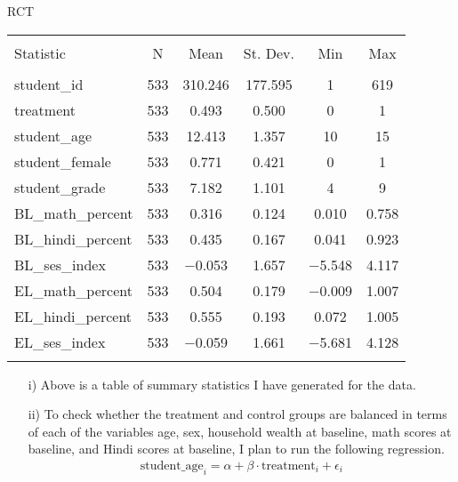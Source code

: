 \begin{homeworkProblem}{RCT}
\begin{enumerate}
    \end{enumerate}

    \begin{solution}
        
        \begin{table}[!htbp] \centering 
            \begin{tabular}{@{\extracolsep{5pt}}lccccc} 
                \\[-1.8ex]\hline 
                \hline \\[-1.8ex] 
                Statistic & \multicolumn{1}{c}{N} & \multicolumn{1}{c}{Mean} & \multicolumn{1}{c}{St. Dev.} & \multicolumn{1}{c}{Min} & \multicolumn{1}{c}{Max} \\ 
                \hline \\[-1.8ex] 
                student\_id & 533 & 310.246 & 177.595 & 1 & 619 \\ 
                treatment & 533 & 0.493 & 0.500 & 0 & 1 \\ 
                student\_age & 533 & 12.413 & 1.357 & 10 & 15 \\ 
                student\_female & 533 & 0.771 & 0.421 & 0 & 1 \\ 
                student\_grade & 533 & 7.182 & 1.101 & 4 & 9 \\ 
                BL\_math\_percent & 533 & 0.316 & 0.124 & 0.010 & 0.758 \\ 
                BL\_hindi\_percent & 533 & 0.435 & 0.167 & 0.041 & 0.923 \\ 
                BL\_ses\_index & 533 & $-$0.053 & 1.657 & $-$5.548 & 4.117 \\ 
                EL\_math\_percent & 533 & 0.504 & 0.179 & $-$0.009 & 1.007 \\ 
                EL\_hindi\_percent & 533 & 0.555 & 0.193 & 0.072 & 1.005 \\ 
                EL\_ses\_index & 533 & $-$0.059 & 1.661 & $-$5.681 & 4.128 \\ 
                \hline \\[-1.8ex] 
            \end{tabular} 
        \end{table} 

        \begin{enumerate}
            \item[i)] Above is a table of summary statistics I have generated
                for the data. 
            \item[ii)] To check whether the treatment and control groups are
                balanced in terms of each of the variables age, sex, household
                wealth at baseline, math scores at baseline, and Hindi scores
                at baseline, I plan to run the following regression. 
                \[
                    \begin{split}
                        \text{student\_age}_i = \alpha + \beta \cdot \text{treatment}_i + \epsilon_i
                    \end{split}
                \]


\end{enumerate}
\end{solution}
\end{homeworkProblem}
